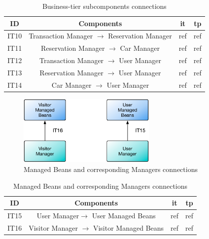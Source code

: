 \begin{table}[htbp]
\begin{center}
\begin{tabular}[t]{cccc}

\hline
\textbf{ID} & \textbf{Components} & \textbf{\acs{it}} & \textbf{\acs{tp}}\\
\hline
IT10 & \enspace Transaction Manager $\rightarrow$ Reservation Manager \enspace & ref & ref\\
\hline
IT11 & \enspace Reservation Manager $\rightarrow$ Car Manager \enspace & ref & ref\\
\hline
IT12 & \enspace Transaction Manager $\rightarrow$ User Manager \enspace & ref & ref\\
\hline
IT13 & \enspace Reservation Manager $\rightarrow$ User Manager \enspace & ref & ref\\
\hline
IT14 & \enspace Car Manager $\rightarrow$ User Manager \enspace & ref & ref\\
\hline

\end{tabular}
\caption{Business-tier subcomponents connections}
\end{center}
\end{table}

\clearpage

\vspace{120pt}

\begin{figure}[htbp]
\centering
\includegraphics[width=0.6\textwidth]{Images/IT15-16.pdf}
\vspace{16pt}
\caption{Managed Beans and corresponding Managers connections}
\label{fig:it15-16}
\end{figure}

\vspace{16pt}

\begin{table}[htbp]
\begin{center}
\begin{tabular}[t]{cccc}

\hline
\textbf{ID} & \textbf{Components} & \textbf{\acs{it}} & \textbf{\acs{tp}}\\
\hline
IT15 & \enspace User  Manager$\rightarrow$ User Managed Beans \enspace & ref & ref\\
\hline
IT16 & \enspace Visitor Manager $\rightarrow$ Visitor Managed Beans \enspace & ref & ref\\
\hline

\end{tabular}
\caption{Managed Beans and corresponding Managers connections}
\end{center}
\end{table}

\clearpage